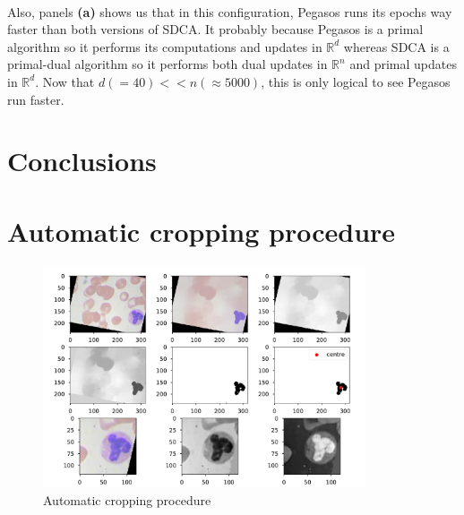 \documentclass[10pt,a4paper]{article}
\begin{document}
\paragraph{}
Also, panels \textbf{(a)} shows us that in this configuration, Pegasos runs its epochs way faster than both versions of SDCA. It probably because Pegasos is a primal algorithm so it performs its computations and updates in $\mathbb{R}^d$ whereas SDCA is a primal-dual algorithm so it performs both dual updates in $\mathbb{R}^n$ and primal updates in $\mathbb{R}^d$. Now that $d (=40) << n(\approx 5000)$, this is only logical to see Pegasos run faster. 


\section{Conclusions}



\printbibliography

\newpage

\appendix

\FloatBarrier
\section{Automatic cropping procedure}

\begin{figure}[!htb]
  \centering
  \includegraphics[width=0.85\textwidth]{Graphs/Find_center.pdf}
  \caption{Automatic cropping procedure}\label{find_centre}
\end{figure}
\end{document}
